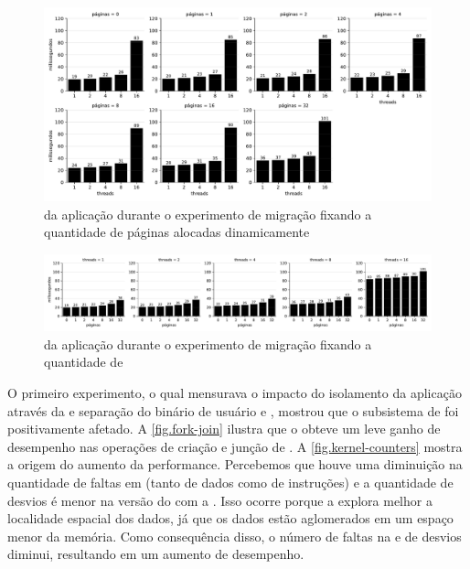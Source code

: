 \begin{figure}[tb]
    \centering
    \includegraphics[width=\linewidth]{content/images/multiple_threads_pages.pdf}
    \caption{\Downtime da aplicação durante o experimento de migração fixando a quantidade de páginas alocadas dinamicamente}
    \label{fig.mtpages}
\end{figure}

\begin{figure}[tb]
    \centering
    \includegraphics[width=\linewidth]{content/images/multiple_threads_threads.pdf}
    \caption{\Downtime da aplicação durante o experimento de migração fixando a quantidade de \threads}
    \label{fig.mtthreads}
\end{figure}

O primeiro experimento, o qual mensurava o impacto do isolamento da aplicação através da \uarea e separação do binário de usuário e , mostrou que o subsistema de \threads foi positivamente afetado. A \autoref{fig.fork-join} ilustra que o \nanvix obteve um leve ganho de desempenho nas operações de criação e junção de \threads. A \autoref{fig.kernel-counters} mostra a origem do aumento da performance. Percebemos que houve uma diminuição na quantidade de faltas em \cache (tanto de dados como de instruções) e a quantidade de desvios é menor na versão do \nanvix com a \uarea. Isso ocorre porque a \uarea explora melhor a localidade espacial dos dados, já que os dados estão aglomerados em um espaço menor da memória. Como consequência disso, o número de faltas na \cache e de desvios diminui, resultando em um aumento de desempenho.

